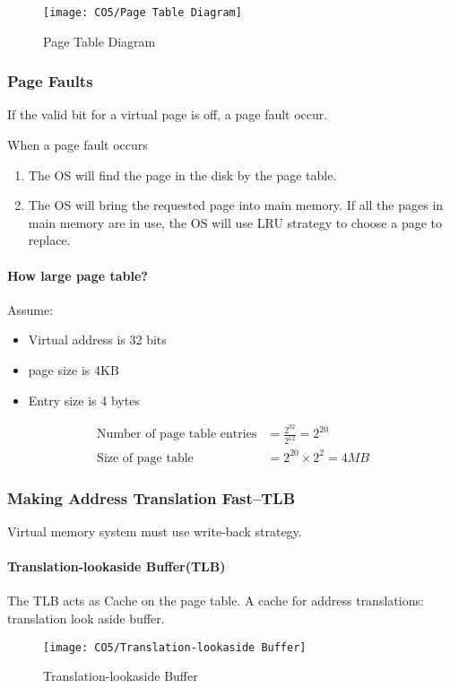 \begin{figure}[!htb]
    \centering
    \texttt{[image: CO5/Page Table Diagram]}
    \caption{Page Table Diagram}
\end{figure}

\subsubsection{Page Faults}
If the valid bit for a virtual page is off, a page fault occur. 

When a page fault occurs
\begin{enumerate}\small
    \item The OS will find the page in the disk by the page table. 
    \item The OS will bring the requested page into main memory. If all the pages in main memory are in use, the OS will use LRU strategy to choose a page to replace. 
\end{enumerate}

\paragraph{How large page table?}
Assume:
\begin{itemize}\small
    \item Virtual address is 32 bits
    \item page size is 4KB
    \item Entry size is 4 bytes
\end{itemize}{\small
    \begin{align*}
        \text{Number of page table entries}&=\frac{2^{32}}{2^{12}}=2^{20}\\
        \text{Size of page table}&=2^{20}\times 2^2=4MB
    \end{align*}
}

\subsubsection{Making Address Translation Fast--TLB}
Virtual memory system must use write-back strategy. 

\paragraph{Translation-lookaside Buffer(TLB)}
The TLB acts as Cache on the page table. A cache for address translations: translation look aside buffer. 

\begin{figure}[!htb]
    \centering
    \texttt{[image: CO5/Translation-lookaside Buffer]}
    \caption{Translation-lookaside Buffer}
\end{figure}

